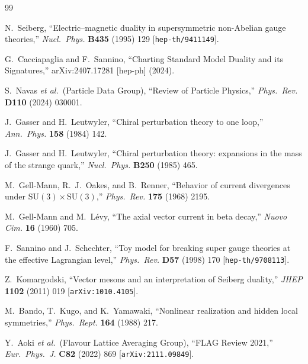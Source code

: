 \documentclass[11pt,a4paper]{article}
\begin{document}
\begin{thebibliography}{99}

  N.~Seiberg,
  ``Electric--magnetic duality in supersymmetric non-Abelian gauge
  theories,''
  \textit{Nucl.~Phys.} \textbf{B435} (1995) 129
  [\texttt{hep-th/9411149}].

  G.~Cacciapaglia and F.~Sannino,
  ``Charting Standard Model Duality and its Signatures,''
  arXiv:2407.17281 [hep-ph] (2024).

  S.~Navas \textit{et al.}\ (Particle Data Group),
  ``Review of Particle Physics,''
  \textit{Phys.~Rev.} \textbf{D110} (2024) 030001.

  J.~Gasser and H.~Leutwyler,
  ``Chiral perturbation theory to one loop,''
  \textit{Ann.~Phys.} \textbf{158} (1984) 142.

  J.~Gasser and H.~Leutwyler,
  ``Chiral perturbation theory: expansions in the mass of the
  strange quark,''
  \textit{Nucl.~Phys.} \textbf{B250} (1985) 465.

  M.~Gell-Mann, R.~J.~Oakes, and B.~Renner,
  ``Behavior of current divergences under $\mathrm{SU}(3) \times
  \mathrm{SU}(3)$,''
  \textit{Phys.~Rev.} \textbf{175} (1968) 2195.

  M.~Gell-Mann and M.~L\'evy,
  ``The axial vector current in beta decay,''
  \textit{Nuovo Cim.} \textbf{16} (1960) 705.

  F.~Sannino and J.~Schechter,
  ``Toy model for breaking super gauge theories at the effective
  Lagrangian level,''
  \textit{Phys.~Rev.} \textbf{D57} (1998) 170
  [\texttt{hep-th/9708113}].

  Z.~Komargodski,
  ``Vector mesons and an interpretation of Seiberg duality,''
  \textit{JHEP} \textbf{1102} (2011) 019
  [\texttt{arXiv:1010.4105}].

  M.~Bando, T.~Kugo, and K.~Yamawaki,
  ``Nonlinear realization and hidden local symmetries,''
  \textit{Phys.~Rept.} \textbf{164} (1988) 217.

  Y.~Aoki \textit{et al.}\ (Flavour Lattice Averaging Group),
  ``FLAG Review 2021,''
  \textit{Eur.~Phys.~J.} \textbf{C82} (2022) 869
  [\texttt{arXiv:2111.09849}].


\end{thebibliography}
\end{document}
